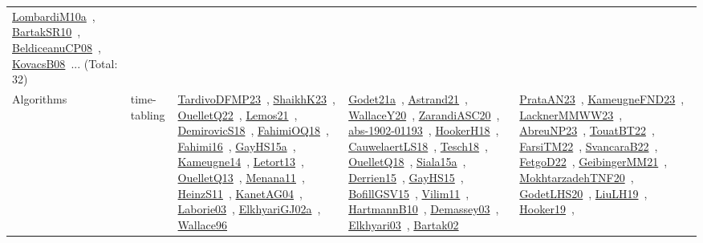{\begin{longtable}{lp{3cm}>{\raggedright\arraybackslash}p{6cm}>{\raggedright\arraybackslash}p{6cm}>{\raggedright\arraybackslash}p{8cm}}
\href{works/LombardiM10a.pdf}{LombardiM10a}~\cite{LombardiM10a}, \href{works/BartakSR10.pdf}{BartakSR10}~\cite{BartakSR10}, \href{works/BeldiceanuCP08.pdf}{BeldiceanuCP08}~\cite{BeldiceanuCP08}, \href{works/KovacsB08.pdf}{KovacsB08}~\cite{KovacsB08}... (Total: 32)\\
Algorithms & time-tabling & \href{works/TardivoDFMP23.pdf}{TardivoDFMP23}~\cite{TardivoDFMP23}, \href{works/ShaikhK23.pdf}{ShaikhK23}~\cite{ShaikhK23}, \href{works/OuelletQ22.pdf}{OuelletQ22}~\cite{OuelletQ22}, \href{works/Lemos21.pdf}{Lemos21}~\cite{Lemos21}, \href{works/DemirovicS18.pdf}{DemirovicS18}~\cite{DemirovicS18}, \href{works/FahimiOQ18.pdf}{FahimiOQ18}~\cite{FahimiOQ18}, \href{works/Fahimi16.pdf}{Fahimi16}~\cite{Fahimi16}, \href{works/GayHS15a.pdf}{GayHS15a}~\cite{GayHS15a}, \href{works/Kameugne14.pdf}{Kameugne14}~\cite{Kameugne14}, \href{works/Letort13.pdf}{Letort13}~\cite{Letort13}, \href{works/OuelletQ13.pdf}{OuelletQ13}~\cite{OuelletQ13}, \href{works/Menana11.pdf}{Menana11}~\cite{Menana11}, \href{works/HeinzS11.pdf}{HeinzS11}~\cite{HeinzS11}, \href{works/KanetAG04.pdf}{KanetAG04}~\cite{KanetAG04}, \href{works/Laborie03.pdf}{Laborie03}~\cite{Laborie03}, \href{works/ElkhyariGJ02a.pdf}{ElkhyariGJ02a}~\cite{ElkhyariGJ02a}, \href{works/Wallace96.pdf}{Wallace96}~\cite{Wallace96} & \href{works/Godet21a.pdf}{Godet21a}~\cite{Godet21a}, \href{works/Astrand21.pdf}{Astrand21}~\cite{Astrand21}, \href{works/WallaceY20.pdf}{WallaceY20}~\cite{WallaceY20}, \href{works/ZarandiASC20.pdf}{ZarandiASC20}~\cite{ZarandiASC20}, \href{works/abs-1902-01193.pdf}{abs-1902-01193}~\cite{abs-1902-01193}, \href{works/HookerH18.pdf}{HookerH18}~\cite{HookerH18}, \href{works/CauwelaertLS18.pdf}{CauwelaertLS18}~\cite{CauwelaertLS18}, \href{works/Tesch18.pdf}{Tesch18}~\cite{Tesch18}, \href{works/OuelletQ18.pdf}{OuelletQ18}~\cite{OuelletQ18}, \href{works/Siala15a.pdf}{Siala15a}~\cite{Siala15a}, \href{works/Derrien15.pdf}{Derrien15}~\cite{Derrien15}, \href{works/GayHS15.pdf}{GayHS15}~\cite{GayHS15}, \href{works/BofillGSV15.pdf}{BofillGSV15}~\cite{BofillGSV15}, \href{works/Vilim11.pdf}{Vilim11}~\cite{Vilim11}, \href{works/HartmannB10.pdf}{HartmannB10}~\cite{HartmannB10}, \href{works/Demassey03.pdf}{Demassey03}~\cite{Demassey03}, \href{works/Elkhyari03.pdf}{Elkhyari03}~\cite{Elkhyari03}, \href{works/Bartak02.pdf}{Bartak02}~\cite{Bartak02} & \href{works/PrataAN23.pdf}{PrataAN23}~\cite{PrataAN23}, \href{works/KameugneFND23.pdf}{KameugneFND23}~\cite{KameugneFND23}, \href{works/LacknerMMWW23.pdf}{LacknerMMWW23}~\cite{LacknerMMWW23}, \href{works/AbreuNP23.pdf}{AbreuNP23}~\cite{AbreuNP23}, \href{works/TouatBT22.pdf}{TouatBT22}~\cite{TouatBT22}, \href{works/FarsiTM22.pdf}{FarsiTM22}~\cite{FarsiTM22}, \href{works/SvancaraB22.pdf}{SvancaraB22}~\cite{SvancaraB22}, \href{works/FetgoD22.pdf}{FetgoD22}~\cite{FetgoD22}, \href{works/GeibingerMM21.pdf}{GeibingerMM21}~\cite{GeibingerMM21}, \href{works/MokhtarzadehTNF20.pdf}{MokhtarzadehTNF20}~\cite{MokhtarzadehTNF20}, \href{works/GodetLHS20.pdf}{GodetLHS20}~\cite{GodetLHS20}, \href{works/LiuLH19.pdf}{LiuLH19}~\cite{LiuLH19}, \href{works/Hooker19.pdf}{Hooker19}~\cite{Hooker19}, 
\end{longtable}}
